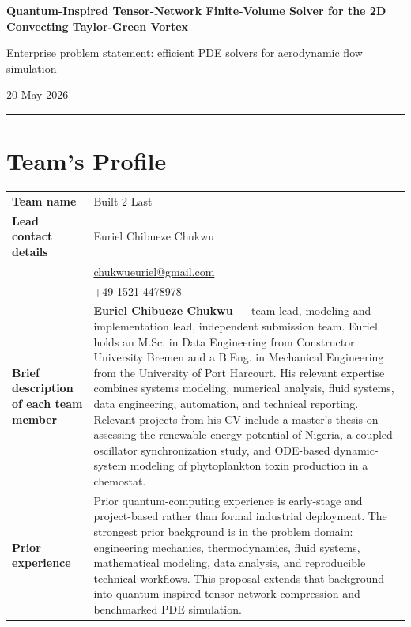 \documentclass[11pt,a4paper]{article}
\begin{document}
\begin{center}
{\Large\bfseries Quantum-Inspired Tensor-Network Finite-Volume Solver for the 2D Convecting Taylor-Green Vortex\par}
\vspace{0.35em}
{\normalsize Enterprise problem statement: efficient PDE solvers for aerodynamic flow simulation\par}
\vspace{0.25em}
{\small 20 May 2026\par}
\end{center}

\vspace{0.4em}
\textcolor{accent}{\rule{\textwidth}{0.8pt}}

\section*{Team's Profile}

\begin{tabularx}{\textwidth}{@{}>{\bfseries}p{}Y@{}}
Team name &
Built 2 Last \\
Lead contact details &
Euriel Chibueze Chukwu \\
&
\href{mailto:chukwueuriel@gmail.com}{chukwueuriel@gmail.com} \\
&
+49 1521 4478978 \\
Brief description of each team member &
\textbf{Euriel Chibueze Chukwu} --- team lead, modeling and implementation lead, independent submission team. Euriel holds an M.Sc. in Data Engineering from Constructor University Bremen and a B.Eng. in Mechanical Engineering from the University of Port Harcourt. His relevant expertise combines systems modeling, numerical analysis, fluid systems, data engineering, automation, and technical reporting. Relevant projects from his CV include a master's thesis on assessing the renewable energy potential of Nigeria, a coupled-oscillator synchronization study, and ODE-based dynamic-system modeling of phytoplankton toxin production in a chemostat. \\
Prior experience &
Prior quantum-computing experience is early-stage and project-based rather than formal industrial deployment. The strongest prior background is in the problem domain: engineering mechanics, thermodynamics, fluid systems, mathematical modeling, data analysis, and reproducible technical workflows. This proposal extends that background into quantum-inspired tensor-network compression and benchmarked PDE simulation. \\
\end{tabularx}
\end{document}
